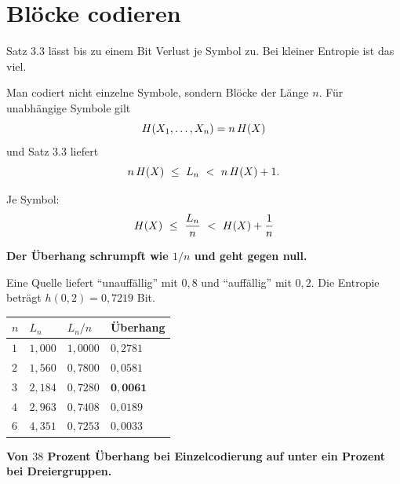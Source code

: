 \section{Blöcke codieren}

\begin{merksatz}
Satz 3.3 lässt bis zu einem Bit Verlust je Symbol zu. Bei kleiner Entropie ist das viel.

Man codiert nicht einzelne Symbole, sondern Blöcke der Länge $n$. Für unabhängige Symbole gilt
\[ H(X_1,\ldots,X_n) = n\,H(X) \]
und Satz 3.3 liefert
\[ n\,\Ent(X) \ \le\ L_n \ <\ n\,\Ent(X)+1 . \]

Je Symbol:
\[ H(X) \ \le\ \frac{L_n}{n} \ <\ H(X) + \frac1n \]

\begin{center}
\begin{minipage}{0.9\textwidth}
\textbf{Der Überhang schrumpft wie $1/n$ und geht gegen null.}
\end{minipage}
\end{center}

Eine Quelle liefert \enquote{unauffällig} mit $0{,}8$ und \enquote{auffällig} mit $0{,}2$. Die Entropie beträgt $h(0{,}2) = 0{,}7219$ Bit.

\begin{center}
{\small
\renewcommand{\arraystretch}{1.48}
\begin{tabular}{@{}P{1.4cm}P{2.0cm}P{2.0cm}P{2.2cm}@{}}
\toprule
$n$ & $L_n$ & $L_n/n$ & \textbf{Überhang}\\
\midrule
$1$ & $1{,}000$ & $1{,}0000$ & $0{,}2781$\\
$2$ & $1{,}560$ & $0{,}7800$ & $0{,}0581$\\
$3$ & $2{,}184$ & $0{,}7280$ & $\mathbf{0{,}0061}$\\
$4$ & $2{,}963$ & $0{,}7408$ & $0{,}0189$\\
$6$ & $4{,}351$ & $0{,}7253$ & $0{,}0033$\\
\bottomrule
\end{tabular}}
\end{center}

\begin{center}
\begin{minipage}{0.9\textwidth}
\textbf{Von $38$ Prozent Überhang bei Einzelcodierung auf unter ein Prozent bei Dreiergruppen.}
\end{minipage}
\end{center}


\end{merksatz}
